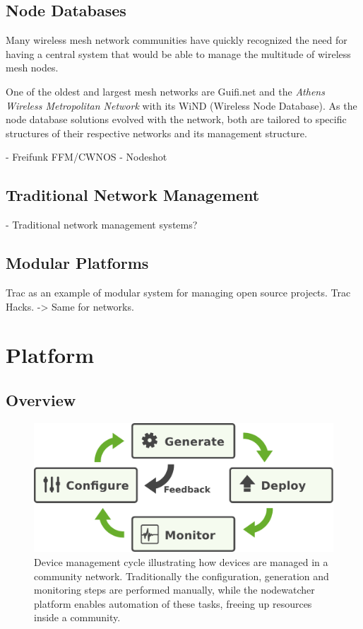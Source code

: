 \documentclass[5p,sort&compress]{elsarticle}
\begin{document}
\subsection{Node Databases}

Many wireless mesh network communities have quickly recognized the need for having a central system that would be able to manage the multitude of wireless mesh nodes.

One of the oldest and largest mesh networks are Guifi.net \cite{Guifi_2003,Vega_2012} and the \textit{Athens Wireless Metropolitan Network} with its WiND \cite{AWMN_WIND_2002} (Wireless Node Database).
As the node database solutions evolved with the network, both are tailored to specific structures of their respective networks and its management structure.

- Freifunk FFM/CWNOS \cite{Funkfeuer_2012}
- Nodeshot \cite{Nodeshot_2012}

\subsection{Traditional Network Management}

- Traditional network management systems?

\subsection{Modular Platforms}

Trac as an example of modular system for managing open source projects.
Trac Hacks. -> Same for networks.

\section{Platform}
\label{sec:platform}

\subsection{Overview}

\begin{figure}
  \centering
  \includegraphics[scale=0.4]{figures/device-mgmt-cycle.pdf}
  \caption{Device management cycle illustrating how devices are managed in a community network.
Traditionally the configuration, generation and monitoring steps are performed manually, while the nodewatcher platform enables automation of these tasks, freeing up resources inside a community.}
  \label{fig:device-mgmt-cycle}
\end{figure}
\end{document}
